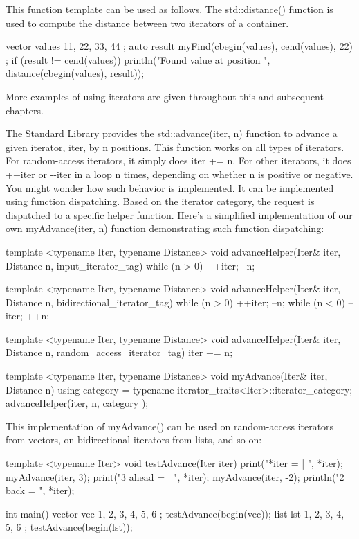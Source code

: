 This function template can be used as follows. The std::distance() function is used to compute the distance between two iterators of a container.

\begin{cpp}
vector values { 11, 22, 33, 44 };
auto result { myFind(cbegin(values), cend(values), 22) };
if (result != cend(values)) {
    println("Found value at position {}", distance(cbegin(values), result));
}
\end{cpp}

More examples of using iterators are given throughout this and subsequent chapters.


The Standard Library provides the std::advance(iter, n) function to advance a given iterator, iter, by n positions. This function works on all types of iterators. For random-access iterators, it simply does iter += n. For other iterators, it does ++iter or -{}-iter in a loop n times, depending on whether n is positive or negative. You might wonder how such behavior is implemented. It can be implemented using function dispatching. Based on the iterator category, the request is dispatched to a specific helper function. Here’s a simplified implementation of our own myAdvance(iter, n) function demonstrating such function dispatching:

\begin{cpp}
template <typename Iter, typename Distance>
void advanceHelper(Iter& iter, Distance n, input_iterator_tag)
{
    while (n > 0) { ++iter; --n; }
}

template <typename Iter, typename Distance>
void advanceHelper(Iter& iter, Distance n, bidirectional_iterator_tag)
{
    while (n > 0) { ++iter; --n; }
    while (n < 0) { --iter; ++n; }
}

template <typename Iter, typename Distance>
void advanceHelper(Iter& iter, Distance n, random_access_iterator_tag)
{
    iter += n;
}

template <typename Iter, typename Distance>
void myAdvance(Iter& iter, Distance n)
{
    using category = typename iterator_traits<Iter>::iterator_category;
    advanceHelper(iter, n, category {});
}
\end{cpp}

This implementation of myAdvance() can be used on random-access iterators from vectors, on bidirectional iterators from lists, and so on:

\begin{cpp}
template <typename Iter>
void testAdvance(Iter iter)
{
    print("*iter = {} | ", *iter);
    myAdvance(iter, 3); print("3 ahead = {} | ", *iter);
    myAdvance(iter, -2); println("2 back = {}", *iter);
}

int main()
{
    vector vec { 1, 2, 3, 4, 5, 6 }; testAdvance(begin(vec));
    list lst { 1, 2, 3, 4, 5, 6 }; testAdvance(begin(lst));
}
\end{cpp}

